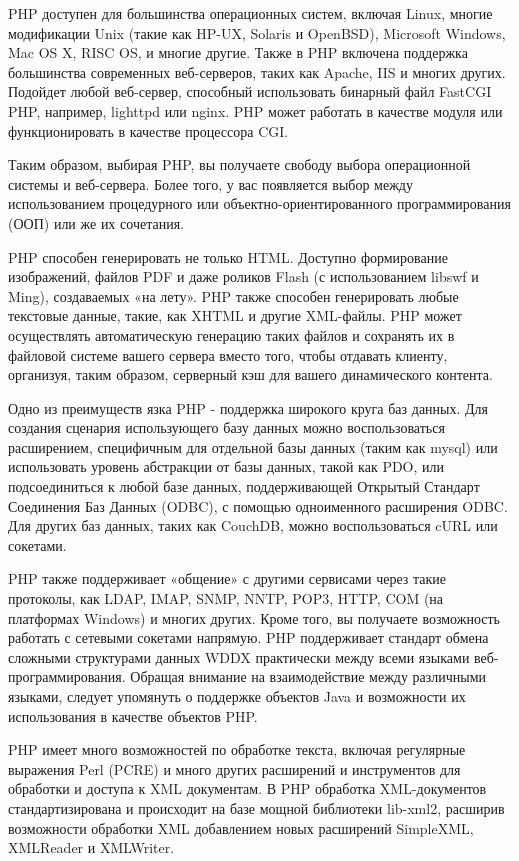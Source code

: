 PHP доступен для большинства операционных систем, включая Linux, многие модификации Unix (такие как HP-UX, Solaris и OpenBSD), Microsoft Windows, Mac OS X, RISC OS, и многие другие. Также в PHP включена поддержка большинства современных веб-серверов, таких как Apache, IIS и многих других. Подойдет любой веб-сервер, способный использовать бинарный файл FastCGI PHP, например, lighttpd или nginx. PHP может работать в качестве модуля или функционировать в качестве процессора CGI.

Таким образом, выбирая PHP, вы получаете свободу выбора операционной системы и веб-сервера. Более того, у вас появляется выбор между использованием процедурного или объектно-ориентированного программирования (ООП) или же их сочетания.

PHP способен генерировать не только HTML. Доступно формирование изображений, файлов PDF и даже роликов Flash (с использованием libswf и Ming), создаваемых «на лету». PHP также способен генерировать любые текстовые данные, такие, как XHTML и другие XML-файлы. PHP может осуществлять автоматическую генерацию таких файлов и сохранять их в файловой системе вашего сервера вместо того, чтобы отдавать клиенту, организуя, таким образом, серверный кэш для вашего динамического контента.

Одно из преимуществ язка PHP - поддержка широкого круга баз данных. Для создания сценария использующего базу данных можно воспользоваться расширением, специфичным для отдельной базы данных (таким как mysql) или использовать уровень абстракции от базы данных, такой как PDO, или подсоединиться к любой базе данных, поддерживающей Открытый Стандарт Соединения Баз Данных (ODBC), с помощью одноименного расширения ODBC. Для других баз данных, таких как CouchDB, можно воспользоваться cURL или сокетами.

PHP также поддерживает «общение» с другими сервисами через такие протоколы, как LDAP, IMAP, SNMP, NNTP, POP3, HTTP, COM (на платформах Windows) и многих других. Кроме того, вы получаете возможность работать с сетевыми сокетами напрямую. PHP поддерживает стандарт обмена сложными структурами данных WDDX практически между всеми языками веб-программирования. Обращая внимание на взаимодействие между различными языками, следует упомянуть о поддержке объектов Java и возможности их использования в качестве объектов PHP.

PHP имеет много возможностей по обработке текста, включая регулярные выражения Perl (PCRE) и много других расширений и инструментов для обработки и доступа к XML документам. В PHP обработка XML-документов стандартизирована и происходит на базе мощной библиотеки lib-xml2, расширив возможности обработки XML добавлением новых расширений SimpleXML, XMLReader и XMLWriter.

